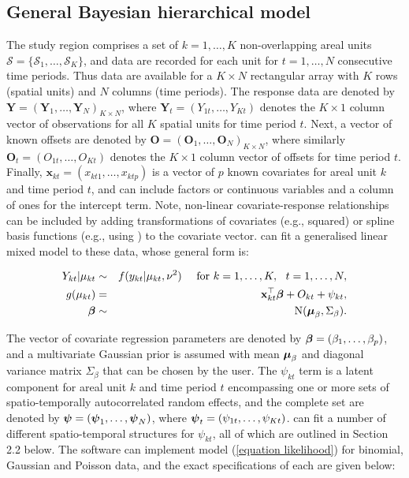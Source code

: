 \documentclass[article, nojss]{jss}
\newcommand{\bd}[1]{\ensuremath{\mbox{\boldmath $#1$}}}
\begin{document}
\subsection{General Bayesian hierarchical model}
The study region comprises a set of $k=1,\ldots,K$ non-overlapping areal units $\mathcal{S}=\{\mathcal{S}_{1},\ldots,\mathcal{S}_{K}\}$, and data are recorded for each unit for $t=1,\ldots,N$ consecutive time periods. Thus data are available for a $K\times N$ rectangular array with $K$ rows (spatial units) and $N$ columns (time periods). The response data are denoted by $\mathbf{Y}=(\mathbf{Y}_{1},\ldots,\mathbf{Y}_{N})_{K\times N}$, where $\mathbf{Y}_{t}=(Y_{1t},\ldots,Y_{Kt})$ denotes the $K\times 1$ column vector of observations for all $K$ spatial units for time period $t$. Next, a vector of known offsets are denoted by $\mathbf{O}=(\mathbf{O}_{1},\ldots,\mathbf{O}_{N})_{K\times N}$, where similarly $\mathbf{O}_{t}=(O_{1t},\ldots,O_{Kt})$ denotes the $K\times 1$ column  vector of offsets for time period $t$. Finally, $\mathbf{x}_{kt}=(x_{kt1},\ldots, x_{ktp})$ is a vector of $p$ known covariates for areal unit $k$ and time period $t$, and can include factors or continuous variables and a column of ones for the intercept term. Note, non-linear covariate-response relationships can be included by adding transformations of covariates (e.g., squared) or spline basis functions (e.g., using ) to the covariate vector.  can fit a generalised linear mixed model to these data, whose general form is:

\begin{eqnarray}
Y_{kt}|\mu_{kt}&\sim&f(y_{kt}|\mu_{kt},\nu^{2})~~~~\mbox{for }k=1,\ldots,K,~~t=1,\ldots,N,\label{equation likelihood}\\
g(\mu_{kt})&=&\mathbf{x}_{kt}^{\top}\bd{\beta} + O_{kt} + \psi_{kt},\nonumber\\
\bd{\beta}&\sim&\mbox{N}(\bd{\mu}_{\beta}, \Sigma_{\beta}).\nonumber
\end{eqnarray}

The vector of covariate regression parameters are denoted by $\bd{\beta}=(\beta_{1},\ldots,\beta_{p})$, and a multivariate Gaussian prior is assumed with mean $\bd{\mu}_{\beta}$ and diagonal variance matrix $\Sigma_{\beta}$  that can be chosen by the user. The $\psi_{kt}$ term is a latent component for areal unit $k$ and time period $t$ encompassing one or more sets of spatio-temporally autocorrelated random effects, and the complete set are denoted by $\bd{\psi}=(\bd{\psi}_{1},\ldots,\bd{\psi}_{N})$, where $\bd{\psi}_{t}=(\psi_{1t},\ldots,\psi_{Kt})$.  can fit a number of different spatio-temporal structures for $\psi_{kt}$, all of which are outlined in Section 2.2 below. The software can implement model (\ref{equation likelihood}) for binomial, Gaussian and Poisson data, and the exact specifications of each are given below:
\end{document}
